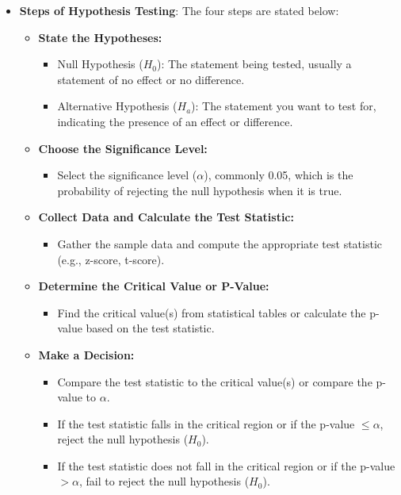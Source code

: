 \documentclass{article}
\begin{document}
\begin{itemize}
\item \textbf{Steps of Hypothesis Testing}: The four steps are stated below:

\begin{itemize}
    \item \textbf{State the Hypotheses:}
    \begin{itemize}
        \item Null Hypothesis ($H_0$): The statement being tested, usually a statement of no effect or no difference.
        \item Alternative Hypothesis ($H_a$): The statement you want to test for, indicating the presence of an effect or difference.
    \end{itemize}
    
    \item \textbf{Choose the Significance Level:}
    \begin{itemize}
        \item Select the significance level ($\alpha$), commonly 0.05, which is the probability of rejecting the null hypothesis when it is true.
    \end{itemize}
    
    \item \textbf{Collect Data and Calculate the Test Statistic:}
    \begin{itemize}
        \item Gather the sample data and compute the appropriate test statistic (e.g., z-score, t-score).
    \end{itemize}
    
    \item \textbf{Determine the Critical Value or P-Value:}
    \begin{itemize}
        \item Find the critical value(s) from statistical tables or calculate the p-value based on the test statistic.
    \end{itemize}
    
    \item \textbf{Make a Decision:}
    \begin{itemize}
        \item Compare the test statistic to the critical value(s) or compare the p-value to $\alpha$.
        \item If the test statistic falls in the critical region or if the p-value $\leq \alpha$, reject the null hypothesis ($H_0$).
        \item If the test statistic does not fall in the critical region or if the p-value $> \alpha$, fail to reject the null hypothesis ($H_0$).
    \end{itemize}
    

\end{itemize}
\end{itemize}
\end{document}
